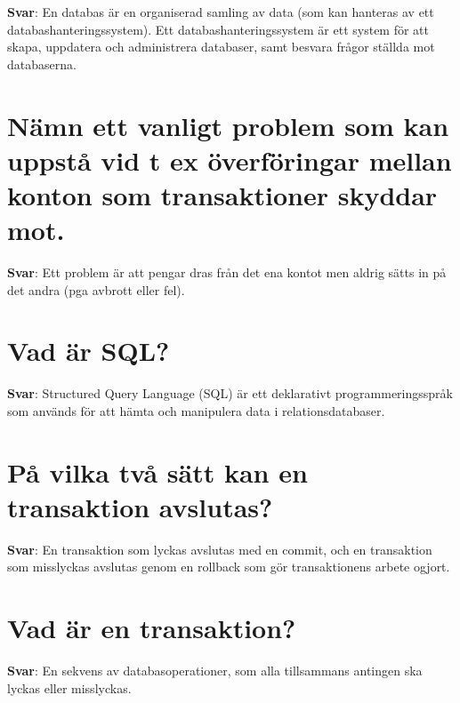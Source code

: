 \documentclass[a4paper,11pt,oneside]{book}
\begin{document}
\begin{sloppypar}
\label{q:282:sa:sv:True}

\textbf{Svar}: En databas \"ar en organiserad samling av data (som kan hanteras av ett databashanteringssystem). Ett databashanteringssystem \"ar ett system f\"or att skapa, uppdatera och administrera databaser, samt besvara fr\r{a}gor st\"allda mot databaserna.



\section{N\"amn ett vanligt problem som kan uppst\r{a} vid t ex \"overf\"oringar mellan konton som transaktioner skyddar mot.}

\label{q:283:sa:sv:True}

\textbf{Svar}: Ett problem \"ar att pengar dras fr\r{a}n det ena kontot men aldrig s\"atts in p\r{a} det andra (pga avbrott eller fel).



\section{Vad \"ar SQL?}

\label{q:284:sa:sv:True}

\textbf{Svar}: Structured Query Language (SQL) \"ar ett deklarativt programmeringsspr\r{a}k som anv\"ands f\"or att h\"amta och manipulera data i relationsdatabaser.



\section{P\r{a} vilka tv\r{a} s\"att kan en transaktion avslutas?}

\label{q:285:sa:sv:True}

\textbf{Svar}: En transaktion som lyckas avslutas med en commit, och en transaktion som misslyckas avslutas genom en rollback som g\"or transaktionens arbete ogjort.



\section{Vad \"ar en transaktion?}

\label{q:286:sa:sv:True}

\textbf{Svar}: En sekvens av databasoperationer, som alla tillsammans antingen ska lyckas eller misslyckas.




\end{sloppypar}
\end{document}
